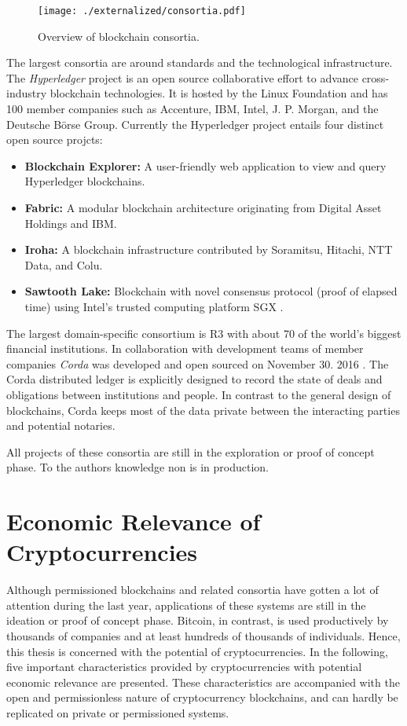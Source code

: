 \begin{figure}[ht]
\centering
\texttt{[image: ./externalized/consortia.pdf]}
\caption{Overview of blockchain consortia.}
\label{fig:eco:consortia}
\end{figure}

The largest consortia are around standards and the technological infrastructure. The \emph{Hyperledger} project is an open source collaborative effort to advance cross-industry blockchain technologies. It is hosted by the Linux Foundation and has 100 member companies such as Accenture, IBM, Intel, J. P. Morgan, and the Deutsche B\"orse Group. Currently the Hyperledger project entails four distinct open source projcts:
\begin{itemize}
	\item \textbf{Blockchain Explorer:} A user-friendly web application to view and query Hyperledger blockchains.
	\item \textbf{Fabric:} A modular blockchain architecture originating from Digital Asset Holdings and IBM.
	\item \textbf{Iroha:} A blockchain infrastructure contributed by Soramitsu, Hitachi, NTT Data, and Colu.
	\item \textbf{Sawtooth Lake:} Blockchain with novel consensus protocol (proof of elapsed time) using Intel's trusted computing platform SGX \parencite{cryptoeprint:2016:086}.
\end{itemize}

The largest domain-specific consortium is R3 with about 70 of the world's biggest financial institutions. In collaboration with development teams of member companies \emph{Corda} was developed and open sourced on November 30. 2016 \parencite{Brown2016corda}. The Corda distributed ledger is explicitly designed to record the state of deals and obligations between institutions and people. In contrast to the general design of blockchains, Corda keeps most of the data private between the interacting parties and potential notaries.

All projects of these consortia are still in the exploration or proof of concept phase. To the authors knowledge non is in production.


\section{Economic Relevance of Cryptocurrencies}

Although permissioned blockchains and related consortia have gotten a lot of attention during the last year, applications of these systems are still in the ideation or proof of concept phase. Bitcoin, in contrast, is used productively by thousands of companies and at least hundreds of thousands of individuals. Hence, this thesis is concerned with the potential of cryptocurrencies. In the following, five important characteristics provided by cryptocurrencies with potential economic relevance are presented. These characteristics are accompanied with the open and permissionless nature of cryptocurrency blockchains, and can hardly be replicated on private or permissioned systems.

